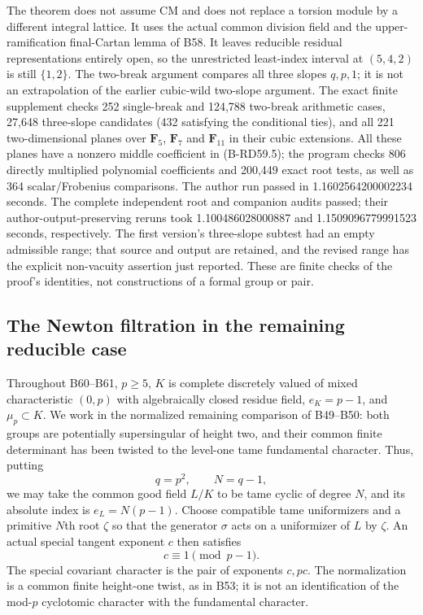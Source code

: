 \begin{remark}
\label{rem:B-RD59-scope}
The theorem does not assume CM and does not replace a torsion module
by a different integral lattice. It uses the actual common division
field and the upper-ramification final-Cartan lemma of B58.
It leaves reducible residual representations entirely open, so the
unrestricted least-index interval at $(5,4,2)$ is still $\{1,2\}$.
The two-break argument compares all three slopes $q,p,1$; it is
not an extrapolation of the earlier cubic-wild two-slope argument.
The exact finite supplement
checks 252 single-break and 124,788 two-break arithmetic cases,
27,648 three-slope candidates (432 satisfying the conditional ties),
and all 221 two-dimensional planes over $\mathbf F_5$, $\mathbf F_7$
and $\mathbf F_{11}$ in their cubic extensions. All these planes
have a nonzero middle coefficient in (B-RD59.5); the program checks
806 directly multiplied polynomial coefficients and 200,449 exact
root tests, as well as 364 scalar/Frobenius comparisons. The author
run passed in 1.1602564200002234 seconds. The complete independent
root and companion audits passed; their author-output-preserving
reruns took 1.100486028000887 and 1.1509096779991523 seconds,
respectively. The first version's
three-slope subtest had an empty admissible range; that source and
output are retained, and the revised range has the explicit
non-vacuity assertion just reported. These are finite checks of
the proof's identities, not constructions of a formal group or pair.
\end{remark}


\subsection{The Newton filtration in the remaining reducible case}

Throughout B60--B61, $p\ge5$, $K$ is complete discretely valued of
mixed characteristic $(0,p)$ with algebraically closed residue field,
$e_K=p-1$, and $\mu_p\subset K$. We work in the normalized remaining
comparison of B49--B50: both groups are potentially supersingular of
height two, and their common finite determinant has been twisted to
the level-one tame fundamental character. Thus, putting
\[
              q=p^2,\qquad N=q-1,
\]
we may take the common good field $L/K$ to be tame cyclic of degree
$N$, and its absolute index is $e_L=N(p-1)$. Choose compatible tame
uniformizers and a primitive $N$th root $\zeta$ so that the generator
$\sigma$ acts on a uniformizer of $L$ by $\zeta$. An actual special
tangent exponent $c$ then satisfies
\[
                    c\equiv1\pmod{p-1}.                \tag{B-RD60.1}
\]
The special covariant character is the pair of exponents $c,pc$.
The normalization is a common finite height-one twist, as in B53;
it is not an identification of the mod-$p$ cyclotomic character
with the fundamental character.

